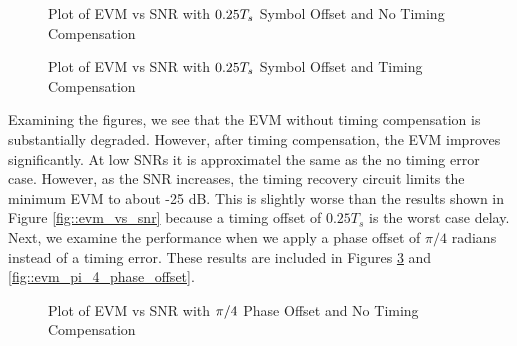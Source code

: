 \documentclass{article}
\begin{document}
\begin{figure}[H]
	\centerline{}
	\caption{Plot of EVM vs SNR with $\protect{0.25T_s}$ Symbol Offset and No Timing Compensation}
	\label{fig::evm_0p25_symbol_offset_no_comp}
\end{figure}

\begin{figure}[H]
	\centerline{}
	\caption{Plot of EVM vs SNR with $\protect{0.25T_s}$ Symbol Offset and Timing Compensation}
	\label{fig::evm_0p25_symbol_offset}
\end{figure}

Examining the figures, we see that the EVM without timing compensation is substantially degraded. However, after timing compensation, the EVM improves significantly. At low SNRs it is approximatel the same as the no timing error case. However, as the SNR increases, the timing recovery circuit limits the minimum EVM to about -25 dB. This is slightly worse than the results shown in Figure \ref{fig::evm_vs_snr} because a timing offset of $0.25T_s$ is the worst case delay. Next, we examine the performance when we apply a phase offset of $\pi/4$ radians instead of a timing error. These results are included in Figures \ref{fig::evm_pi_4_phase_offset_no_comp} and \ref{fig::evm_pi_4_phase_offset}.

\begin{figure}[H]
	\centerline{}
	\caption{Plot of EVM vs SNR with $\protect\pi/4$ Phase Offset and No Timing Compensation}
	\label{fig::evm_pi_4_phase_offset_no_comp}
\end{figure}
\end{document}
